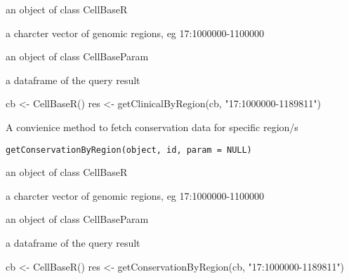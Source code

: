\documentclass[letterpaper]{book}
\begin{document}
%
\begin{Arguments}
\begin{ldescription}
\item[\code{object}] an object of class CellBaseR

\item[\code{id}] a charcter vector of genomic regions, eg 17:1000000-1100000

\item[\code{param}] an object of class CellBaseParam
\end{ldescription}
\end{Arguments}
%
\begin{Value}
a dataframe of the query result
\end{Value}
%
\begin{Examples}
\begin{ExampleCode}
cb <- CellBaseR()
res <- getClinicalByRegion(cb, "17:1000000-1189811")
\end{ExampleCode}
\end{Examples}
%
\begin{Description}\relax
A convienice method to fetch conservation data for specific region/s
\end{Description}
%
\begin{Usage}
\begin{verbatim}
getConservationByRegion(object, id, param = NULL)
\end{verbatim}
\end{Usage}
%
\begin{Arguments}
\begin{ldescription}
\item[\code{object}] an object of class CellBaseR

\item[\code{id}] a charcter vector of genomic regions, eg 17:1000000-1100000

\item[\code{param}] an object of class CellBaseParam
\end{ldescription}
\end{Arguments}
%
\begin{Value}
a dataframe of the query result
\end{Value}
%
\begin{Examples}
\begin{ExampleCode}
cb <- CellBaseR()
res <- getConservationByRegion(cb, "17:1000000-1189811")
\end{ExampleCode}
\end{Examples}
\end{document}
